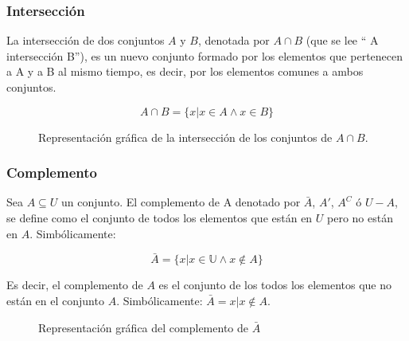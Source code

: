 \subsubsection*{Intersección}

La intersección de dos conjuntos $A$ y $B$, denotada por $A \cap B$ (que se lee
“ A intersección B”), es un nuevo conjunto formado por los elementos que
pertenecen a A y a B al mismo tiempo, es decir, por los elementos comunes a
ambos conjuntos.

\begin{equation}
    A \cap B=\{x | x \in A \wedge x \in B\}
\end{equation}

\begin{figure}[h]
    \centering
    \caption{Representación gráfica de la intersección de los conjuntos de $A \cap B$.}
    \label{fig:interseccionConjuntos}
\end{figure}

\subsubsection*{Complemento}

Sea $A \subseteq U$ un conjunto. El complemento de A denotado por $\bar{A}$,
$A'$, $A^C$ ó $U-A$, se define como el conjunto de todos los elementos que están
en $U$ pero no están en $A$. Simbólicamente:

\begin{equation}
    \bar{A}= \{x | x \in \mathbb U \wedge x \notin A\}
\end{equation}

Es decir, el complemento de $A$ es el conjunto de los todos los elementos que no
están en el conjunto $A$. Simbólicamente: $ \bar{A}={x | x \notin A}$.

\begin{figure}[h]
    \centering
    \caption{Representación gráfica del complemento de $\bar{A}$}
    \label{fig:unionConjuntos}
\end{figure}

